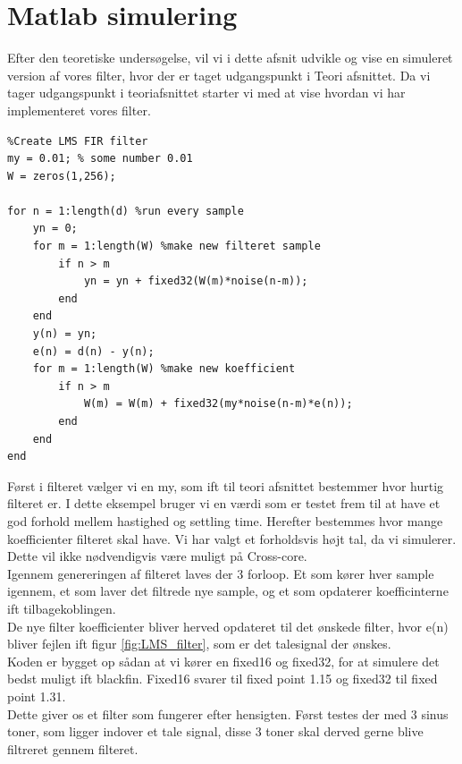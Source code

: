 \graphicspath{{Chapters/Matlab/}}


\section{Matlab simulering}

Efter den teoretiske undersøgelse, vil vi i dette afsnit udvikle og vise en simuleret version af vores filter, hvor der er taget udgangspunkt i Teori afsnittet. Da vi tager udgangspunkt i teoriafsnittet starter vi med at vise hvordan vi har implementeret vores filter. 

\begin{lstlisting}
%Create LMS FIR filter
my = 0.01; % some number 0.01
W = zeros(1,256);

for n = 1:length(d) %run every sample 
    yn = 0;
    for m = 1:length(W) %make new filteret sample 
        if n > m
            yn = yn + fixed32(W(m)*noise(n-m));
        end
    end
    y(n) = yn;
    e(n) = d(n) - y(n);
    for m = 1:length(W) %make new koefficient  
        if n > m
            W(m) = W(m) + fixed32(my*noise(n-m)*e(n));
        end
    end
end
\end{lstlisting}

Først i filteret vælger vi en my, som ift til teori afsnittet bestemmer hvor hurtig filteret er. I dette eksempel bruger vi en værdi som er testet frem til at have et god forhold mellem hastighed og settling time. Herefter bestemmes hvor mange koefficienter filteret skal have. Vi har valgt et forholdsvis højt tal, da vi simulerer. Dette vil ikke nødvendigvis være muligt på Cross-core. \\

Igennem genereringen af filteret laves der 3 forloop. Et som kører hver sample igennem, et som laver det filtrede nye sample, og et som opdaterer koefficinterne ift tilbagekoblingen. \\
De nye filter koefficienter bliver herved opdateret til det ønskede filter, hvor e(n) bliver fejlen ift figur \ref{fig:LMS_filter}, som er det talesignal der ønskes. \\
Koden er bygget op sådan at vi kører en fixed16 og fixed32, for at simulere det bedst muligt ift blackfin. Fixed16 svarer til fixed point 1.15 og fixed32 til fixed point 1.31. 
\\
Dette giver os et filter som fungerer efter hensigten. Først testes der med 3 sinus toner, som ligger indover et tale signal, disse 3 toner skal derved gerne blive filtreret gennem filteret. 
\newpage
